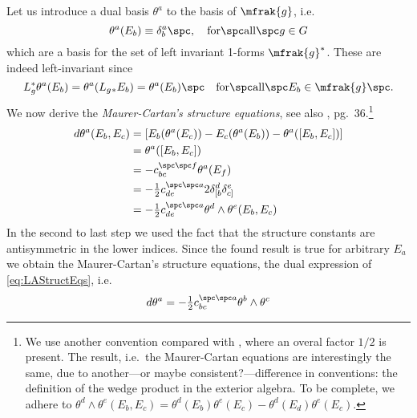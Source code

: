 \documentclass[10pt,reqno]{amsart}
\numberwithin{equation}{section}
\begin{document}
Let us introduce a dual basis $\theta^a$ to the basis of 
$\mfrak{g}$, i.e.\
%
\begin{equation}
	\theta^a (E_b) \equiv \delta^a_b\spc,\quad\mathrm{for\spc 
		all}\spc g\in G
\end{equation}
%
which are a basis for the set of left invariant 1-forms 
$\mfrak{g}^\ast$.  These are indeed left-invariant since
%
\begin{displaymath}
	L^\ast_g \theta^a(E_b) = \theta^a(L_g{}_\ast E_b) = 
	\theta^a(E_b)\spc
	\quad\mathrm{for\spc all}\spc E_b \in \mfrak{g}\spc.
\end{displaymath}
%
We now derive the \emph{Maurer-Cartan's structure equations}, see 
also \cite{kob1996found}, pg.\ 36.\footnote{We use another 
	convention compared with \cite{kob1996found}, where an overal 
	factor $1/2$ is present. The result, i.e.\ the Maurer-Cartan 
	equations are interestingly the same, due to another---or maybe 
	consistent?---difference in conventions: the definition of the 
	wedge product in the exterior algebra. To be complete, we 
	adhere to $\theta^d \wedge \theta^e(E_b,E_c) = 
	\theta^d(E_b)\theta^e(E_c) - \theta^d(E_d)\theta^e(E_c)$.}
%
\begin{align*}
	d\theta^a(E_b,E_c) &= \left[E_b(\theta^a(E_c)) - 
		E_c(\theta^a(E_b)) - \theta^a([E_b,E_c])
		 \right] \\
	 &= \theta^a([E_b,E_c]) \\
	 &= -c_{bc}^{\spc\spc f} \theta^a(E_f) \\
	 &= -\tfrac{1}{2} c_{de}^{\spc\spc a} 2\delta^d_{[b} 
	 \delta^e_{c]} \\
	 &= -\tfrac{1}{2} c_{de}^{\spc\spc a} \theta^d \wedge \theta^e
	(E_b,E_c)
\end{align*}
%
In the second to last step we used the fact that the structure 
constants are antisymmetric in the lower indices.
Since the found result is true for arbitrary $E_a$ we obtain the 
Maurer-Cartan's structure equations, the dual expression of 
\eqref{eq:LAStructEqs}, i.e.\
%
\begin{equation}\label{eq:MCeqs}
	d\theta^a = -\tfrac{1}{2} c_{bc}^{\spc\spc a} \theta^b \wedge 
	\theta^c
\end{equation}
%
\end{document}
